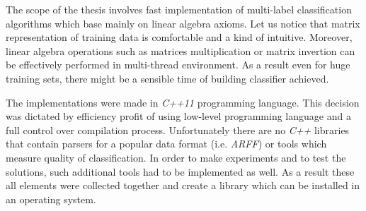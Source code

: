 The scope of the thesis involves fast implementation of multi-label classification algorithms which base mainly on linear algebra axioms. Let us notice that matrix representation of training data is comfortable and a kind of intuitive. Moreover, linear algebra operations such as matrices multiplication or matrix invertion can be effectively performed in multi-thread environment.  As a result even for huge training sets, there might be a sensible time of building classifier achieved. 

The implementations were made in \textit{C++11} programming language. This decision was dictated by efficiency profit of using low-level programming language and a full control over compilation process. Unfortunately there are no  \textit{C++} libraries that contain parsers for a popular data format (i.e. \textit{ARFF}) or tools which measure quality of classification. In order to make experiments and to test the solutions, such additional tools had to be implemented as well. As a result these all elements were collected together and create a library which can be installed in an operating system.


